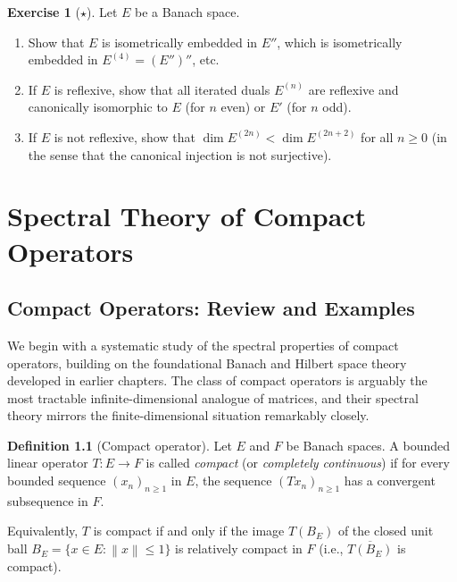 \documentclass[a4paper,12pt]{book}
\newcommand{\norm}[1]{\left\| #1 \right\|}
\theoremstyle{definition}
\newtheorem{definition}{Definition}[chapter]
\newtheorem{exercise}{Exercise}[chapter]
\theoremstyle{plain}
\theoremstyle{remark}
\begin{document}
\begin{exercise}[$\star$]\label{exo:bidual-chain}
Let $E$ be a Banach space.
\begin{enumerate}[label=(\alph*)]
  \item Show that $E$ is isometrically embedded in $E''$, which is isometrically
        embedded in $E^{(4)} = (E'')''$, etc.
  \item If $E$ is reflexive, show that all iterated duals $E^{(n)}$ are
        reflexive and canonically isomorphic to $E$ (for $n$ even) or $E'$
        (for $n$ odd).
  \item If $E$ is not reflexive, show that $\dim E^{(2n)} < \dim E^{(2n+2)}$
        for all $n\ge 0$ (in the sense that the canonical injection is not
        surjective).
\end{enumerate}
\end{exercise}

\chapter{Spectral Theory of Compact Operators}\label{ch:compact-spectral}
\minitoc

\section{Compact Operators: Review and Examples}\label{sec:compact-review}


We begin with a systematic study of the spectral properties of compact operators,
building on the foundational Banach and Hilbert space theory developed in earlier
chapters. The class of compact operators is arguably the most tractable
infinite-dimensional analogue of matrices, and their spectral theory mirrors the
finite-dimensional situation remarkably closely.

\begin{definition}[Compact operator]\label{def:compact-op}
Let $E$ and $F$ be Banach spaces. A bounded linear operator $T \colon E \to F$ is
called \emph{compact} (or \emph{completely continuous}) if for every bounded
sequence $(x_n)_{n \ge 1}$ in $E$, the sequence $(Tx_n)_{n \ge 1}$ has a
convergent subsequence in $F$.

Equivalently, $T$ is compact if and only if the image $T(B_E)$ of the closed
unit ball $B_E = \{x \in E : \norm{x} \le 1\}$ is relatively compact in $F$
(i.e., $\overline{T(B_E)}$ is compact).
\end{definition}
\end{document}
